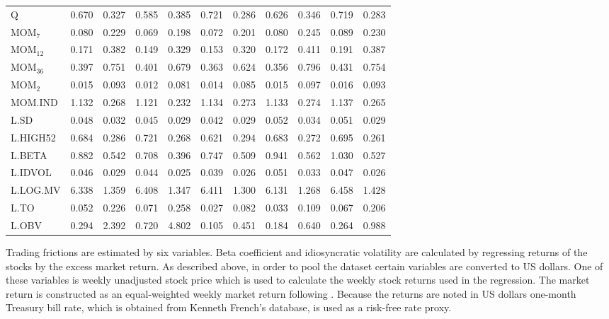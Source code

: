 \documentclass[12pt]{article}
\begin{document}
\begin{table}[ht]
\begin{tabularx}{\textwidth}{@{\extracolsep{1pt}} X r r r r r r r r r r}
Q			& 0.670 	& 0.327	& 0.585 	& 0.385	& 0.721	& 0.286	& 0.626	& 0.346	& 0.719 	& 0.283 \\
MOM$_{7}$ 	& 0.080 	& 0.229	& 0.069 	& 0.198	& 0.072	& 0.201	& 0.080	& 0.245	& 0.089	& 0.230 \\
MOM$_{12}$ 	& 0.171	& 0.382	& 0.149 	& 0.329	& 0.153	& 0.320	& 0.172	& 0.411	& 0.191	& 0.387 \\
MOM$_{36}$ 	& 0.397	& 0.751	& 0.401 	& 0.679	& 0.363	& 0.624	& 0.356	& 0.796	& 0.431	& 0.754 \\
MOM$_{2}$ 	& 0.015 	& 0.093	& 0.012 	& 0.081	& 0.014	& 0.085	& 0.015	& 0.097	& 0.016	& 0.093 \\ 
MOM.IND 	& 1.132 	& 0.268	& 1.121 	& 0.232	& 1.134	& 0.273	& 1.133	& 0.274	& 1.137	& 0.265 \\
L.SD	 		& 0.048	& 0.032	& 0.045 	& 0.029	& 0.042	& 0.029	& 0.052	& 0.034	& 0.051	& 0.029 \\
L.HIGH52		& 0.684 	& 0.286	& 0.721 	& 0.268	& 0.621	& 0.294	& 0.683	& 0.272	& 0.695	& 0.261 \\
L.BETA	 	& 0.882 	& 0.542	& 0.708 	& 0.396	& 0.747	& 0.509	& 0.941	& 0.562	& 1.030	& 0.527 \\
L.IDVOL	 	& 0.046 	& 0.029	& 0.044 	& 0.025	& 0.039	& 0.026	& 0.051	& 0.033	& 0.047	& 0.026 \\ 
L.LOG.MV	& 6.338  	& 1.359	& 6.408 	& 1.347	& 6.411	& 1.300	& 6.131	& 1.268	& 6.458	& 1.428 \\ 
L.TO		 	& 0.052  	& 0.226	& 0.071 	& 0.258	& 0.027	& 0.082	& 0.033	& 0.109	& 0.067	& 0.206 \\
L.OBV		& 0.294 	& 2.392	& 0.720 	& 4.802	& 0.105	& 0.451	& 0.184	& 0.640	& 0.264	& 0.988 \\ 
\bottomrule
\end{tabularx}
\end{table} 

Trading frictions are estimated by six variables. Beta coefficient and idiosyncratic volatility are calculated by regressing returns of the stocks by the excess market return. As described above, in order to pool the dataset certain variables are converted to US dollars. One of these variables is weekly unadjusted stock price which is used to calculate the weekly stock returns used in the regression. The market return is constructed as an equal-weighted weekly market return following \citet*{Green2017}.\footnotemark {} Because the returns are noted in US dollars one-month Treasury bill rate, which is obtained from Kenneth French's database\footnotemark {}, is used as a risk-free rate proxy. \par
\end{document}
